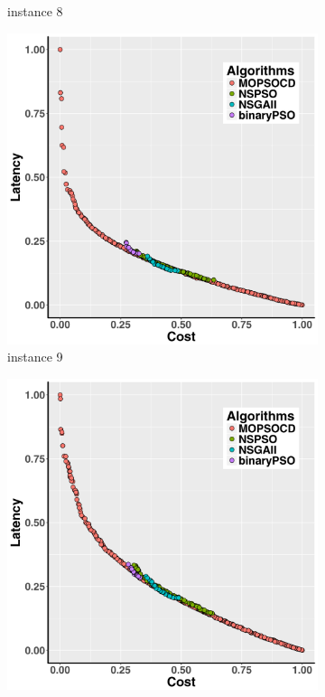 \documentclass[10pt,journal,compsoc]{IEEEtran}
\begin{document}
\begin{figure}[ht]
\begin{subfigure}{0.21\linewidth}
    \caption{instance 8}
   \end{subfigure}
      \begin{subfigure}{0.21\linewidth}
       \includegraphics[width=\textwidth]{pics/total9.png}
    \caption{instance 9}
   \end{subfigure}
   \begin{subfigure}{0.21\linewidth}
       \includegraphics[width=\textwidth]{pics/total10.png}

\end{subfigure}
\end{figure}
\end{document}
